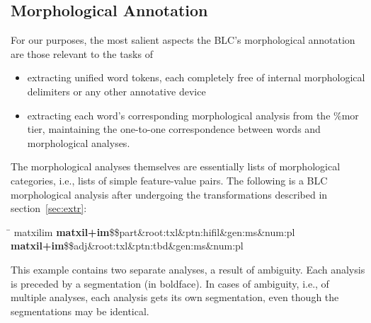 \subsection{Morphological Annotation}
\label{sec:morph-annotation}
For our purposes, the most salient aspects the \ac{BLC}'s morphological 
annotation are those relevant to the tasks of
\begin{itemize}
\item extracting unified word tokens, each completely free of internal morphological 
delimiters or any other annotative device
\item extracting each word's corresponding morphological analysis from the 
\textsf{\%mor} tier, maintaining the one-to-one
correspondence between words and morphological analyses. 
\end{itemize} %
The morphological analyses themselves are essentially lists of morphological categories, 
i.e., lists of simple feature-value pairs.
The following is a \ac{BLC} morphological analysis after undergoing the transformations 
described in section~\ref{sec:extr}:
\begin{exe} 
\ex \label{ex:finished}
\begin{tabbing}
\hspace{0.8in} \= \hspace{5.5in} \kill
\textsf{matxilim} \> \textsf{\textbf{matxil+im}\$\$part\&root:txl\&ptn:hifil\&gen:ms\&num:pl}\, \\
\> \textsf{\textbf{matxil+im}\$\$adj\&root:txl\&ptn:tbd\&gen:ms\&num:pl}
\end{tabbing}
\end{exe}
This example contains two separate analyses, a result of ambiguity. 
Each analysis is preceded by a segmentation (in boldface). 
In cases of ambiguity, i.e., of multiple analyses, each analysis gets its own 
segmentation, even though the segmentations may be identical.

